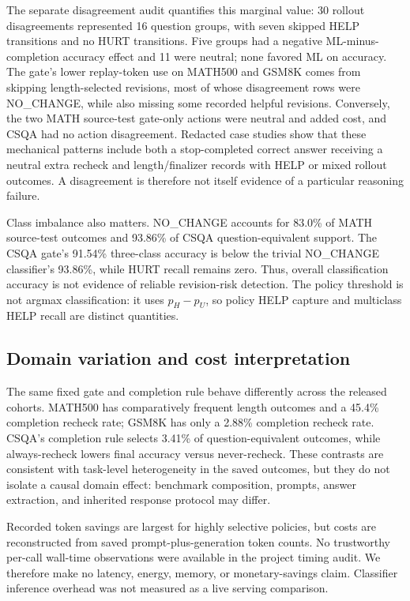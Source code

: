 \documentclass[conference]{IEEEtran}
\begin{document}
The separate disagreement audit quantifies this marginal value: 30 rollout disagreements represented 16 question groups, with seven skipped HELP transitions and no HURT transitions. Five groups had a negative ML-minus-completion accuracy effect and 11 were neutral; none favored ML on accuracy. The gate's lower replay-token use on MATH500 and GSM8K comes from skipping length-selected revisions, most of whose disagreement rows were NO\_CHANGE, while also missing some recorded helpful revisions. Conversely, the two MATH source-test gate-only actions were neutral and added cost, and CSQA had no action disagreement. Redacted case studies show that these mechanical patterns include both a stop-completed correct answer receiving a neutral extra recheck and length/finalizer records with HELP or mixed rollout outcomes. A disagreement is therefore not itself evidence of a particular reasoning failure.

Class imbalance also matters. NO\_CHANGE accounts for 83.0\% of MATH source-test outcomes and 93.86\% of CSQA question-equivalent support. The CSQA gate's 91.54\% three-class accuracy is below the trivial NO\_CHANGE classifier's 93.86\%, while HURT recall remains zero. Thus, overall classification accuracy is not evidence of reliable revision-risk detection. The policy threshold is not argmax classification: it uses $p_H-p_U$, so policy HELP capture and multiclass HELP recall are distinct quantities.

\subsection{Domain variation and cost interpretation}
The same fixed gate and completion rule behave differently across the released cohorts. MATH500 has comparatively frequent length outcomes and a 45.4\% completion recheck rate; GSM8K has only a 2.88\% completion recheck rate. CSQA's completion rule selects 3.41\% of question-equivalent outcomes, while always-recheck lowers final accuracy versus never-recheck. These contrasts are consistent with task-level heterogeneity in the saved outcomes, but they do not isolate a causal domain effect: benchmark composition, prompts, answer extraction, and inherited response protocol may differ.

Recorded token savings are largest for highly selective policies, but costs are reconstructed from saved prompt-plus-generation token counts. No trustworthy per-call wall-time observations were available in the project timing audit. We therefore make no latency, energy, memory, or monetary-savings claim. Classifier inference overhead was not measured as a live serving comparison.
\end{document}
